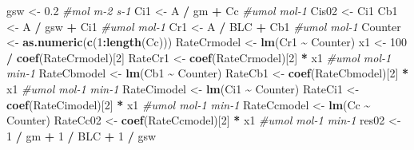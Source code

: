 \documentclass[
]{krantz}
\makeatletter
\newenvironment{Shaded}{\begin{snugshade}}{\end{snugshade}}
\newcommand{\CommentTok}[1]{\textcolor[rgb]{0.56,0.35,0.01}{\textit{#1}}}
\newcommand{\DecValTok}[1]{\textcolor[rgb]{0.00,0.00,0.81}{#1}}
\newcommand{\FloatTok}[1]{\textcolor[rgb]{0.00,0.00,0.81}{#1}}
\newcommand{\KeywordTok}[1]{\textcolor[rgb]{0.13,0.29,0.53}{\textbf{#1}}}
\newcommand{\NormalTok}[1]{#1}
\newcommand{\OperatorTok}[1]{\textcolor[rgb]{0.81,0.36,0.00}{\textbf{#1}}}
\newcommand{\StringTok}[1]{\textcolor[rgb]{0.31,0.60,0.02}{#1}}
\newenvironment{kframe}{%
\medskip{}
\setlength{\fboxsep}{.8em}
 \def\at@end@of@kframe{}%
 \ifinner\ifhmode%
  \def\at@end@of@kframe{\end{minipage}}%
  \begin{minipage}{\columnwidth}%
 \fi\fi%
 \def\FrameCommand##1{\hskip\@totalleftmargin \hskip-\fboxsep
 \colorbox{shadecolor}{##1}\hskip-\fboxsep
     \hskip-\linewidth \hskip-\@totalleftmargin \hskip\columnwidth}%
 \MakeFramed {\advance\hsize-\width
   \@totalleftmargin\z@ \linewidth\hsize
   \@setminipage}}%
 {\par\unskip\endMakeFramed%
 \at@end@of@kframe}
\renewenvironment{Shaded}{\begin{kframe}}{\end{kframe}}
\makeatother
\begin{document}
\begin{Shaded}
\begin{Highlighting}[]
\NormalTok{gsw \textless{}{-}}\StringTok{ }\FloatTok{0.2} \CommentTok{\#mol m{-}2 s{-}1}
\NormalTok{Ci1 \textless{}{-}}\StringTok{ }\NormalTok{A }\OperatorTok{/}\StringTok{ }\NormalTok{gm }\OperatorTok{+}\StringTok{ }\NormalTok{Cc }\CommentTok{\#umol mol{-}1}
\NormalTok{Cis02 \textless{}{-}}\StringTok{ }\NormalTok{Ci1}
\NormalTok{Cb1 \textless{}{-}}\StringTok{ }\NormalTok{A }\OperatorTok{/}\StringTok{ }\NormalTok{gsw }\OperatorTok{+}\StringTok{ }\NormalTok{Ci1 }\CommentTok{\#umol mol{-}1}
\NormalTok{Cr1 \textless{}{-}}\StringTok{ }\NormalTok{A }\OperatorTok{/}\StringTok{ }\NormalTok{BLC }\OperatorTok{+}\StringTok{ }\NormalTok{Cb1 }\CommentTok{\#umol mol{-}1}
\NormalTok{Counter \textless{}{-}}\StringTok{ }\KeywordTok{as.numeric}\NormalTok{(}\KeywordTok{c}\NormalTok{(}\DecValTok{1}\OperatorTok{:}\KeywordTok{length}\NormalTok{(Cc)))}
\NormalTok{RateCrmodel \textless{}{-}}\StringTok{ }\KeywordTok{lm}\NormalTok{(Cr1 }\OperatorTok{\textasciitilde{}}\StringTok{ }\NormalTok{Counter)}
\NormalTok{x1 \textless{}{-}}\StringTok{ }\DecValTok{100} \OperatorTok{/}\StringTok{ }\KeywordTok{coef}\NormalTok{(RateCrmodel)[}\DecValTok{2}\NormalTok{]}
\NormalTok{RateCr1 \textless{}{-}}\StringTok{ }\KeywordTok{coef}\NormalTok{(RateCrmodel)[}\DecValTok{2}\NormalTok{] }\OperatorTok{*}\StringTok{ }\NormalTok{x1 }\CommentTok{\#umol mol{-}1 min{-}1}
\NormalTok{RateCbmodel \textless{}{-}}\StringTok{ }\KeywordTok{lm}\NormalTok{(Cb1 }\OperatorTok{\textasciitilde{}}\StringTok{ }\NormalTok{Counter)}
\NormalTok{RateCb1 \textless{}{-}}\StringTok{ }\KeywordTok{coef}\NormalTok{(RateCbmodel)[}\DecValTok{2}\NormalTok{] }\OperatorTok{*}\StringTok{ }\NormalTok{x1 }\CommentTok{\#umol mol{-}1 min{-}1}
\NormalTok{RateCimodel \textless{}{-}}\StringTok{ }\KeywordTok{lm}\NormalTok{(Ci1 }\OperatorTok{\textasciitilde{}}\StringTok{ }\NormalTok{Counter)}
\NormalTok{RateCi1 \textless{}{-}}\StringTok{ }\KeywordTok{coef}\NormalTok{(RateCimodel)[}\DecValTok{2}\NormalTok{] }\OperatorTok{*}\StringTok{ }\NormalTok{x1 }\CommentTok{\#umol mol{-}1 min{-}1}
\NormalTok{RateCcmodel \textless{}{-}}\StringTok{ }\KeywordTok{lm}\NormalTok{(Cc }\OperatorTok{\textasciitilde{}}\StringTok{ }\NormalTok{Counter)}
\NormalTok{RateCc02 \textless{}{-}}\StringTok{ }\KeywordTok{coef}\NormalTok{(RateCcmodel)[}\DecValTok{2}\NormalTok{] }\OperatorTok{*}\StringTok{ }\NormalTok{x1 }\CommentTok{\#umol mol{-}1 min{-}1}
\NormalTok{res02 \textless{}{-}}\StringTok{ }\DecValTok{1} \OperatorTok{/}\StringTok{ }\NormalTok{gm }\OperatorTok{+}\StringTok{ }\DecValTok{1} \OperatorTok{/}\StringTok{ }\NormalTok{BLC }\OperatorTok{+}\StringTok{ }\DecValTok{1} \OperatorTok{/}\StringTok{ }\NormalTok{gsw}


\end{Highlighting}
\end{Shaded}
\end{document}
